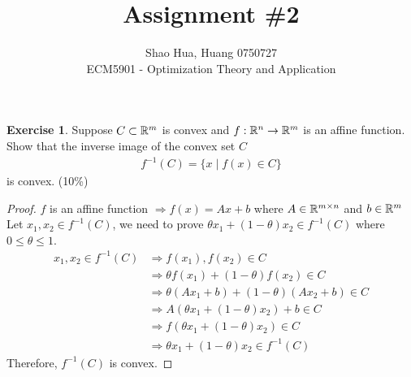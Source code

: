 \documentclass[12pt]{extarticle}
\title{Assignment \#2}
\author{Shao Hua, Huang 0750727\\
ECM5901 - Optimization Theory and Application}
\theoremstyle{definition}
\newtheorem{exercise}{Exercise}
\begin{document}
\maketitle

\begin{exercise}
  Suppose $C\subset \mathbb{R}^m$ is convex and $f:\mathbb{R}^n\rightarrow \mathbb{R}^m$ is an affine function. Show that the inverse image of the convex set $C$
  \begin{align*}
    f^{-1}(C)=\{x\mid f(x)\in C\}
  \end{align*}
  is convex. (10\%)
\end{exercise}
\begin{proof}
  $f$ is an affine function $\Rightarrow f(x)=Ax+b$ where $A\in\mathbb{R}^{m\times n}$ and $b\in\mathbb{R}^m$\\
  Let $x_1, x_2 \in f^{-1}(C)$, we need to prove $\theta x_1+(1-\theta)x_2\in f^{-1}(C)$ where $0\le\theta\le 1$.
  \begin{align*}
    x_1, x_2\in f^{-1}(C)
        &\Rightarrow f(x_1), f(x_2)\in C\\
        &\Rightarrow \theta f(x_1)+(1-\theta)f(x_2)\in C\\
        &\Rightarrow \theta (Ax_1+b)+(1-\theta)(Ax_2+b)\in C\\
        &\Rightarrow A(\theta x_1+(1-\theta)x_2)+b\in C\\
        &\Rightarrow f(\theta x_1+(1-\theta)x_2)\in C\\
        &\Rightarrow \theta x_1+(1-\theta)x_2\in f^{-1}(C)
  \end{align*}
  Therefore, $f^{-1}(C)$ is convex.
\end{proof}
    
\end{document}
